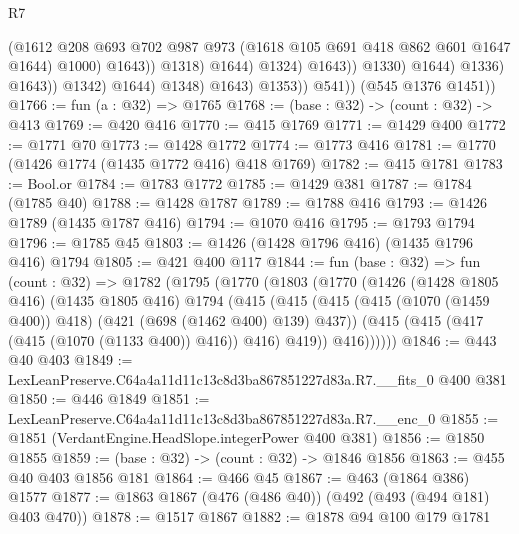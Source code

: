 \begin{lexlean}{R7}
\begin{coremodule}
                                              (@1612
                                                @208
                                                @693
                                                @702
                                                @987
                                                @973
                                                (@1618 @105 @691 @418 @862 @601 @1647 @1644)
                                                @1000)
                                              @1643))
                                          @1318)
                                        @1644)
                                      @1324)
                                    @1643))
                                @1330)
                              @1644)
                            @1336)
                          @1643))
                      @1342)
                    @1644)
                  @1348)
                @1643)
              @1353))
          @541))
      (@545 @1376 @1451))
@1766 := fun (a : @32) => @1765
@1768 := (base : @32) -> (count : @32) -> @413
@1769 := @420 @416
@1770 := @415 @1769
@1771 := @1429 @400
@1772 := @1771 @70
@1773 := @1428 @1772
@1774 := @1773 @416
@1781 := @1770 (@1426 @1774 (@1435 @1772 @416) @418 @1769)
@1782 := @415 @1781
@1783 := Bool.or
@1784 := @1783 @1772
@1785 := @1429 @381
@1787 := @1784 (@1785 @40)
@1788 := @1428 @1787
@1789 := @1788 @416
@1793 := @1426 @1789 (@1435 @1787 @416)
@1794 := @1070 @416
@1795 := @1793 @1794
@1796 := @1785 @45
@1803 := @1426 (@1428 @1796 @416) (@1435 @1796 @416) @1794
@1805 := @421 @400 @117
@1844 := fun (base : @32) =>
  fun (count : @32) =>
  @1782
    (@1795
      (@1770
        (@1803
          (@1770
            (@1426
              (@1428 @1805 @416)
              (@1435 @1805 @416)
              @1794
              (@415
                (@415
                  (@415 (@415 (@1070 (@1459 @400)) @418) (@421 (@698 (@1462 @400) @139) @437))
                  (@415 (@415 (@417 (@415 (@1070 (@1133 @400)) @416)) @416) @419))
                @416))))))
@1846 := @443 @40 @403
@1849 := LexLeanPreserve.C64a4a11d11c13c8d3ba867851227d83a.R7.__fits_0 @400 @381
@1850 := @446 @1849
@1851 := LexLeanPreserve.C64a4a11d11c13c8d3ba867851227d83a.R7.__enc_0
@1855 := @1851 (VerdantEngine.HeadSlope.integerPower @400 @381)
@1856 := @1850 @1855
@1859 := (base : @32) -> (count : @32) -> @1846 @1856
@1863 := @455 @40 @403 @1856 @181
@1864 := @466 @45
@1867 := @463 (@1864 @386) @1577
@1877 := @1863 @1867 (@476 (@486 @40)) (@492 (@493 (@494 @181) @403 @470))
@1878 := @1517 @1867
@1882 := @1878 @94 @100 @179 @1781

\end{coremodule}
\end{lexlean}
